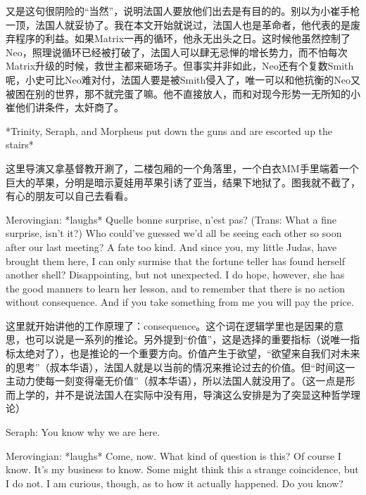 \documentclass[UTF8]{ctexart}
\newenvironment{myquote}{\color{green} \setlength{\leftskip}{6em} \setlength{\rightskip}{4em} \setlength{\parindent}{-2em}}{\par}
\begin{document}
又是这句很阴险的“当然”，说明法国人要放他们出去是有目的的。别以为小崔手枪一顶，法国人就妥协了。我在本文开始就说过，法国人也是革命者，他代表的是废弃程序的利益。如果Matrix一再的循环，他永无出头之日。这时候他虽然控制了Neo，照理说循环已经被打破了，法国人可以肆无忌惮的增长势力，而不怕每次Matrix升级的时候，救世主都来砸场子。但事实并非如此，Neo还有个复数Smith呢，小史可比Neo难对付，法国人要是被Smith侵入了，唯一可以和他抗衡的Neo又被困在别的世界，那不就完蛋了嘛。他不直接放人，而和对现今形势一无所知的小崔他们讲条件，太奸商了。

\begin{myquote}
*Trinity, Seraph, and Morpheus put down the guns and are escorted up the stairs*
\end{myquote}

这里导演又拿基督教开涮了，二楼包厢的一个角落里，一个白衣MM手里端着一个巨大的苹果，分明是暗示夏娃用苹果引诱了亚当，结果下地狱了。图我就不截了，有心的朋友可以自己去看看。

\begin{myquote}
Merovingian: *laughs* Quelle bonne surprise, n'est pas? (Trans: What a fine surprise, isn't it?) Who could've guessed we'd all be seeing each other so soon after our last meeting? A fate too kind. And since you, my little Judas, have brought them here, I can only surmise that the fortune teller has found herself another shell? Disappointing, but not unexpected. I do hope, however, she has the good manners to learn her lesson, and to remember that there is no action without consequence. And if you take something from me you will pay the price.
\end{myquote}

这里就开始讲他的工作原理了：consequence。这个词在逻辑学里也是因果的意思，也可以说是一系列的推论。另外提到“价值”，这是选择的重要指标（说唯一指标太绝对了），也是推论的一个重要方向。价值产生于欲望，“欲望来自我们对未来的思考”（叔本华语），法国人就是以当前的情况来推论过去的价值。但“时间这一主动力使每一刻变得毫无价值”（叔本华语），所以法国人就没用了。（这一点是形而上学的，并不是说法国人在实际中没有用，导演这么安排是为了突显这种哲学理论）

\begin{myquote}
Seraph: You know why we are here.

Merovingian: *laughs* Come, now. What kind of question is this? Of course I know. It's my business to know. Some might think this a strange coincidence, but I do not. I am curious, though, as to how it actually happened. Do you know?
\end{myquote}
\end{document}
